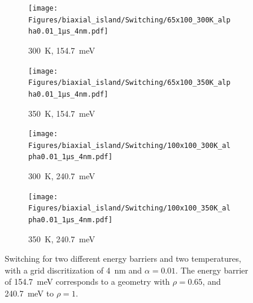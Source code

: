 \documentclass[11pt,a4paper,english,twoside]{article}
\begin{document}
\begin{figure}
     \centering
     \begin{subfigure}[b]{0.49\textwidth}
         \centering
         \texttt{[image: Figures/biaxial\_island/Switching/65x100\_300K\_alpha0.01\_1µs\_4nm.pdf]}
         \caption{\SI{300}{\kelvin}, \SI{154.7}{\milli\electronvolt}}
         \label{fig:switching-temp-300-65x100}
     \end{subfigure}
     \hfill
     \begin{subfigure}[b]{0.49\textwidth}
         \centering
         \texttt{[image: Figures/biaxial\_island/Switching/65x100\_350K\_alpha0.01\_1µs\_4nm.pdf]}
         \caption{\SI{350}{\kelvin}, \SI{154.7}{\milli\electronvolt}}
         \label{fig:switching-temp-350-65x100}
     \end{subfigure}
     \begin{subfigure}[b]{0.49\textwidth}
         \centering
         \texttt{[image: Figures/biaxial\_island/Switching/100x100\_300K\_alpha0.01\_1µs\_4nm.pdf]}
         \caption{\SI{300}{\kelvin}, \SI{240.7}{\milli\electronvolt}}
         \label{fig:switching-temp-300-100x100}
     \end{subfigure}
     \hfill
     \begin{subfigure}[b]{0.49\textwidth}
         \centering
         \texttt{[image: Figures/biaxial\_island/Switching/100x100\_350K\_alpha0.01\_1µs\_4nm.pdf]}
         \caption{\SI{350}{\kelvin}, \SI{240.7}{\milli\electronvolt}}
         \label{fig:switching-temp-350-100x100}
     \end{subfigure}
    \caption{Switching for two different energy barriers and two temperatures, with a grid discritization of \SI{4}{\nano\metre} and $\alpha = 0.01$. The energy barrier of \SI{154.7}{\milli\electronvolt} corresponds to a geometry with $\rho=0.65$, and \SI{240.7}{\milli\electronvolt} to $\rho=1$.}
    \label{fig:switching-temp}
\end{figure}
\end{document}
